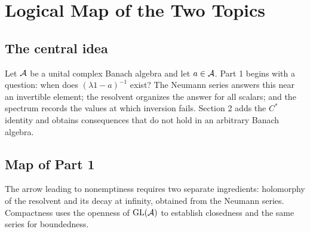 \chapter{Logical Map of the Two Topics}

\section{The central idea}

Let $\mathcal A$ be a unital complex Banach algebra and let $a\in\mathcal A$. Part 1 begins with a question:
when does $(\lambda1-a)^{-1}$ exist? The Neumann series answers this near an invertible
element; the resolvent organizes the answer for all scalars; and the spectrum records the values
at which inversion fails. Section 2 adds the $C^*$ identity and obtains consequences that do not
hold in an arbitrary Banach algebra.

\section{Map of Part 1}

\begin{center}
\end{center}

The arrow leading to nonemptiness requires two separate ingredients: holomorphy of the
resolvent and its decay at infinity, obtained from the Neumann series. Compactness uses
the openness of $\operatorname{GL}(\mathcal A)$ to establish closedness and the same series for boundedness.

